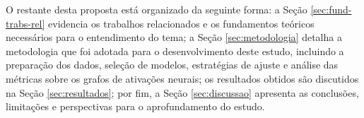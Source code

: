 O restante desta proposta está organizado da seguinte forma: a Seção \ref{sec:fund-trabs-rel} evidencia os trabalhos relacionados e os fundamentos teóricos necessários para o entendimento do tema; a Seção \ref{sec:metodologia} detalha a metodologia que foi adotada para o desenvolvimento deste estudo, incluindo a preparação dos dados, seleção de modelos, estratégias de ajuste e análise das métricas sobre os grafos de ativações neurais; os resultados obtidos são discutidos na Seção \ref{sec:resultados}; por fim, a Seção \ref{sec:discussao} apresenta as conclusões, limitações e perspectivas para o aprofundamento do estudo.